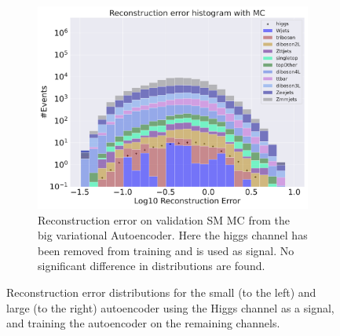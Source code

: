 \begin{figure}[h!]
\begin{subfigure}{.45\textwidth}
        \includegraphics[width=\textwidth]{Figures/VAE_testing/big/b_data_recon_big_rm3_feats_sig_higgs.pdf}
        \caption{Reconstruction error on validation SM MC from the big variational Autoencoder. Here the higgs channel has been removed from training and 
        is used as signal. No significant difference in distributions are found. }
        \label{fig:vae_big_higgs}
    \end{subfigure}
    \hfill  
    \caption[Reconstruction error using Higgs channel as signal]{Reconstruction error distributions for the small (to the left) and large (to the right) autoencoder using the Higgs channel as a signal, and 
    training the autoencoder on the remaining channels. }
    \label{fig:vae_big_channel_1}
\end{figure}

